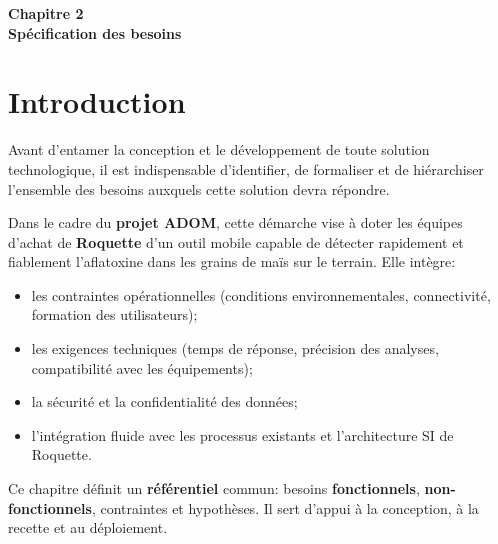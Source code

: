 \documentclass[12pt,a4paper]{report}
\begin{document}
\cleardoublepage
\thispagestyle{empty}
\begin{center}
    \vspace*{4cm}
    {\Huge \textbf{Chapitre 2}}\\[1.5cm]
    {\LARGE \textbf{Spécification des besoins}}
\end{center}
\cleardoublepage

\setcounter{section}{0}

\section{Introduction}
Avant d’entamer la conception et le développement de toute solution technologique,
il est indispensable d’identifier, de formaliser et de hiérarchiser l’ensemble des besoins
auxquels cette solution devra répondre.

\medskip
\noindent
Dans le cadre du \textbf{projet ADOM}, cette démarche vise à doter les équipes d’achat de \textbf{Roquette}
d’un outil mobile capable de détecter rapidement et fiablement l’aflatoxine dans les grains de maïs sur le terrain.
Elle intègre:

\begin{itemize}
    \item les contraintes opérationnelles (conditions environnementales, connectivité, formation des utilisateurs);
    \item les exigences techniques (temps de réponse, précision des analyses, compatibilité avec les équipements);
    \item la sécurité et la confidentialité des données;
    \item l’intégration fluide avec les processus existants et l’architecture SI de Roquette.
\end{itemize}

\medskip
\noindent
Ce chapitre définit un \textbf{référentiel} commun: besoins \textbf{fonctionnels}, \textbf{non-fonctionnels}, contraintes et hypothèses. Il sert d’appui à la conception, à la recette et au déploiement.
\end{document}
